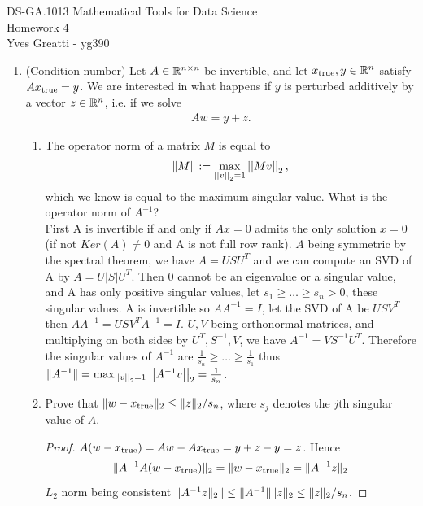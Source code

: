 \documentclass[12pt,twoside]{article}
\begin{document}
\noindent DS-GA.1013 Mathematical Tools for Data Science \\
Homework 4\\
Yves Greatti - yg390\\

\begin{enumerate}

\item (Condition number) Let $A\in \mathbb{R}^{n\times n}$ be invertible, and let $x_{\operatorname{true}},y\in \mathbb{R}^n$
  satisfy $Ax_{\operatorname{true}}=y$. We are interested in what happens if $y$ is perturbed additively by a vector $z\in \mathbb{R}^n$, i.e. if we solve 
\begin{align}
A w=y+z.
\end{align}
  \begin{enumerate}
  \item The operator norm of a matrix $M$ is equal to 
  \begin{align}
  \lVert M\rVert := \max_{\left|\left| v \right|\right| _{2} = 1} \left|\left| Mv \right|\right| _{2},
  \end{align}  
  which we know is equal to the maximum singular value. What is the operator norm of $A^{-1}$?\\
  
  \medskip
  First A is invertible if and only if $A x = 0$ admits the only solution $x=0$ (if not $Ker(A) \neq {0}$ and A is not full row rank). 
  $A$ being symmetric by the spectral theorem, we have $A=U S U^T$ and we can compute an SVD of A by $A=U |S| U^T$.
  Then 0 cannot be an eigenvalue or a singular value, and A has only positive singular values, let $s_1 \ge \ldots \ge s_n > 0$, these singular values.
  A is invertible so $A A^{-1} = I$, let the SVD of A be $U S V^T$ then $A A^{-1} = U S V^T A^{-1} = I$.
  $U, V$ being orthonormal matrices, and multiplying on both sides by $U^T, S^{-1}, V$, we have $A^{-1} =  V S^{-1} U^T$.
  Therefore the singular values of $A^{-1}$ are $\frac{1}{s_n} \ge \ldots \ge \frac{1}{s_1}$ thus $\lVert A^{-1}\rVert =  \max_{\left|\left| v \right|\right| _{2} = 1} \left|\left| A^{-1}v \right|\right| _{2} = \frac{1}{s_n}$.
  \medskip
    
  \item Prove that $\|w-x_{\operatorname{true}}\|_2 \leq \|z\|_2/s_n$, where
    $s_j$ denotes the $j$th singular value of $A$. \\
    
  \begin{proof}
  	$A (w - x_{\operatorname{true}}) = A w - A x_{\operatorname{true}} = y + z - y = z$. Hence
	$$ \| A ^{-1} A (w - x_{\operatorname{true}}) \|_2 = \| w - x_{\operatorname{true}} \|_2 = \| A^{-1} z \|_2 $$
	$L_2$ norm being consistent $\| A^{-1} z \|_2 \| \le \lVert A^{-1}\rVert \| z \|_2 \le \|z\|_2/s_n$.


\end{proof}
\end{enumerate}
\end{enumerate}
\end{document}
